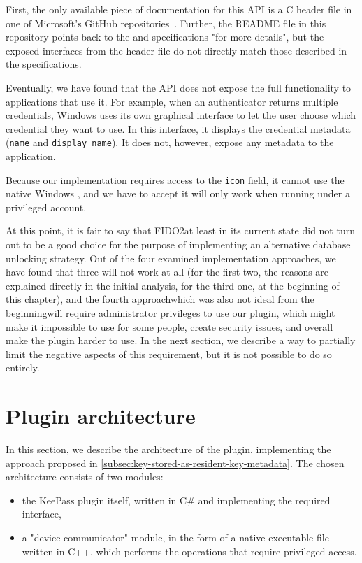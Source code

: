 First, the only available piece of documentation for this API is a C header file in one of Microsoft's GitHub repositories~\cite{microsoft:webauthn}.
Further, the README file in this repository points back to the  and  specifications "for more details",
but the exposed interfaces from the header file do not directly match those described in the specifications.

Eventually, we have found that the API does not expose the full functionality to applications that use it.
For example, when an authenticator returns multiple credentials, Windows uses its own graphical interface
to let the user choose which credential they want to use. In this interface, it displays the credential
metadata (\texttt{name} and \texttt{display name}). It does not, however,
expose any metadata to the application.

Because our implementation requires access to the \texttt{icon} field, it cannot
use the native Windows , and we have to accept it will only work when running under a privileged account.

At this point, it is fair to say that FIDO2\textemdash at least in its current state\textemdash
did not turn out to be a good choice for the purpose of implementing an alternative database unlocking strategy. Out of the four examined implementation approaches,
we have found that three will not work at all (for the first two, the reasons are explained directly in the initial analysis, for the third one, at the beginning of this chapter),
and the fourth approach\textemdash which was also not ideal from the beginning\textemdash will require administrator privileges to use our plugin,
which might make it impossible to use for some people, create security issues, and overall make the plugin harder to use. In the next section,
we describe a way to partially limit the negative aspects of this requirement, but it is not possible to do so entirely.

\section{Plugin architecture}\label{sec:plugin-architecture}

In this section, we describe the architecture of the plugin, implementing the approach proposed in \autoref{subsec:key-stored-as-resident-key-metadata}.
The chosen architecture consists of two modules:

\begin{itemize}
	\item the KeePass plugin itself, written in C\# and implementing the required interface,
	\item a "device communicator" module, in the form of a native executable file written in C++, which performs the operations that require privileged access.
\end{itemize}

